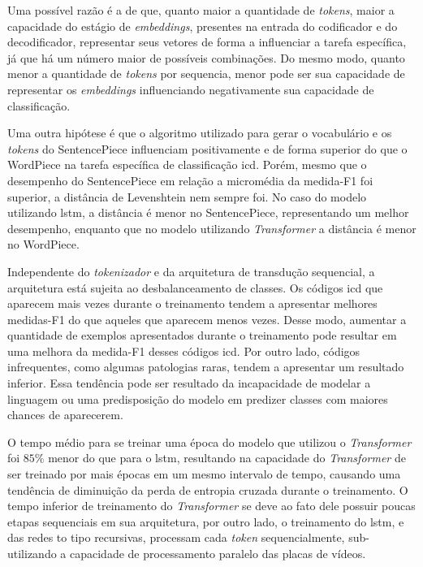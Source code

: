 Uma possível razão é a de que, quanto maior a quantidade de \textit{tokens}, maior a capacidade do estágio de \textit{embeddings}, presentes na entrada do codificador e do decodificador, representar seus vetores de forma a influenciar  a tarefa específica, já que há um número maior de possíveis combinações. Do mesmo modo, quanto menor a quantidade de \textit{tokens} por sequencia, menor pode ser sua capacidade de representar os \textit{embeddings} influenciando negativamente sua capacidade de classificação.

Uma outra hipótese é que o algoritmo utilizado para gerar o vocabulário e os \textit{tokens} do SentencePiece influenciam positivamente e de forma superior do que o WordPiece na tarefa específica de classificação \gls{icd}. Porém, mesmo que o desempenho do SentencePiece em relação a micromédia da medida-F1 foi superior, a distância de Levenshtein nem sempre foi. No caso do modelo utilizando \gls{lstm}, a distância é menor no SentencePiece, representando um melhor desempenho, enquanto que no modelo utilizando \textit{Transformer} a distância é menor no WordPiece.

Independente do \textit{tokenizador} e da arquitetura de transdução sequencial, a arquitetura está sujeita ao desbalanceamento de classes. Os códigos \gls{icd} que aparecem mais vezes durante o treinamento tendem a apresentar melhores medidas-F1 do que aqueles que aparecem menos vezes. Desse modo, aumentar a quantidade de exemplos apresentados durante o treinamento pode resultar em uma melhora da medida-F1 desses códigos \gls{icd}. Por outro lado, códigos infrequentes, como algumas patologias raras, tendem a apresentar um resultado inferior. Essa tendência pode ser resultado da incapacidade de modelar a linguagem ou uma predisposição do modelo em predizer classes com maiores chances de aparecerem.

O tempo médio para se treinar uma época do modelo que utilizou o \textit{Transformer} foi $85\%$ menor do que para o \gls{lstm}, resultando na capacidade do \textit{Transformer} de ser treinado por mais épocas em um mesmo intervalo de tempo, causando uma tendência de diminuição da perda de entropia cruzada durante o treinamento. O tempo inferior de treinamento do \textit{Transformer} se deve ao fato dele possuir poucas etapas sequenciais em sua arquitetura, por outro lado, o treinamento do \gls{lstm}, e das redes to tipo recursivas, processam cada \textit{token} sequencialmente, sub-utilizando a capacidade de processamento paralelo das placas de vídeos. 

